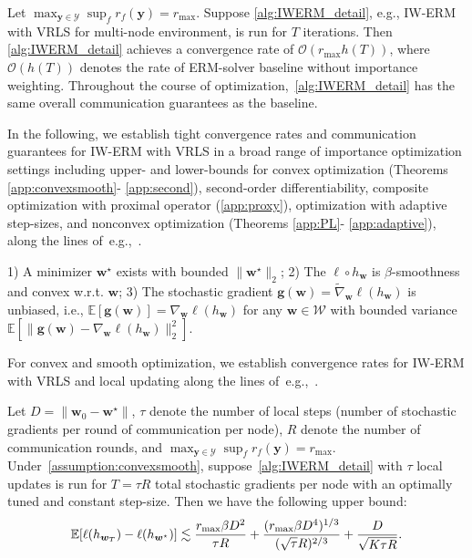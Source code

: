 \begin{theorem}
\label{thm:conv} Let $\max_{\boldsymbol{y}\in\mathcal{Y}}\sup_f r_f(\boldsymbol{y})=r_{\max}$.  Suppose \cref{alg:IWERM_detail}, e.g., IW-ERM with VRLS for multi-node environment, is run for $T$ iterations. Then \cref{alg:IWERM_detail} achieves a convergence rate of $\mathcal{O}(r_{\max} h(T))$, where $\mathcal{O}(h(T))$ denotes the rate of ERM-solver baseline without importance weighting. Throughout the course of optimization,~\cref{alg:IWERM_detail} has the same overall communication guarantees as the baseline.
\end{theorem}

In the following, we establish tight convergence rates and communication guarantees for IW-ERM with VRLS in a broad range of importance optimization settings including upper- and lower-bounds for convex optimization (Theorems \ref{app:convexsmooth}- \ref{app:second}), second-order differentiability, composite optimization with proximal operator (\cref{app:proxy}), optimization with adaptive step-sizes, and nonconvex optimization (Theorems \ref{app:PL}- \ref{app:adaptive}), along the lines of~e.g.,~\citep{woodworth2020local,haddadpour2021federated,glasgow2022sharp,liu2023high,Prox,AdaptiveFL,liu2023high}. 

\begin{assumption}
\label{assumption:convexsmooth} 1) A minimizer $\boldsymbol{w}^\star$ exists with bounded $\|\boldsymbol{w}^\star\|_2$; 2) The $\ell\circ h_{\boldsymbol{w}}$ is $\beta$-smoothness and convex w.r.t. $\boldsymbol{w}$; 3) The stochastic gradient $\boldsymbol{g}(\boldsymbol{w})=\widetilde\nabla_{\boldsymbol{w}}\ell(h_{\boldsymbol{w}})$ is unbiased, i.e., $\mathbb{E}[\boldsymbol{g}(\boldsymbol{w})]=\nabla_{\boldsymbol{w}}\ell(h_{\boldsymbol{w}})$ for any $\boldsymbol{w}\in\mathcal{W}$ with bounded variance  $\mathbb{E}[\|\boldsymbol{g}(\boldsymbol{w})-\nabla_{\boldsymbol{w}}\ell(h_{\boldsymbol{w}})\|_2^2]$.
\end{assumption}


For convex and smooth optimization, we establish convergence rates for IW-ERM with VRLS and local updating along the lines of~e.g.,~\citep[Theorem 2]{woodworth2020local}. 


\begin{theorem}
\label{app:convexsmooth} Let $D=\|\boldsymbol{w}_0-\boldsymbol{w}^\star\|$, $\tau$ denote the number of local steps (number of stochastic gradients per round of communication per node),  $R$ denote the number of communication rounds, and $\max_{\boldsymbol{y}\in\mathcal{Y}}\sup_f r_f(\boldsymbol{y})=r_{\max}$. Under~\cref{assumption:convexsmooth}, suppose~\cref{alg:IWERM_detail} with $\tau$ local updates is run for $T=\tau R$ total stochastic gradients per node with an optimally tuned and constant step-size. Then we have the following upper bound: 
\begin{align}
\mathbb{E}[\ell(h_{\boldsymbol{w}_T})-\ell(h_{\boldsymbol{w}^\star})]  \lesssim \frac{{r}_{\max} \beta D^2}{\tau R}+\frac{(r_{\max} \beta D^4)^{1/3}}{(\sqrt{\tau}R)^{2/3}} +\frac{D}{\sqrt{K\tau R}}.    
\end{align}
\end{theorem}

